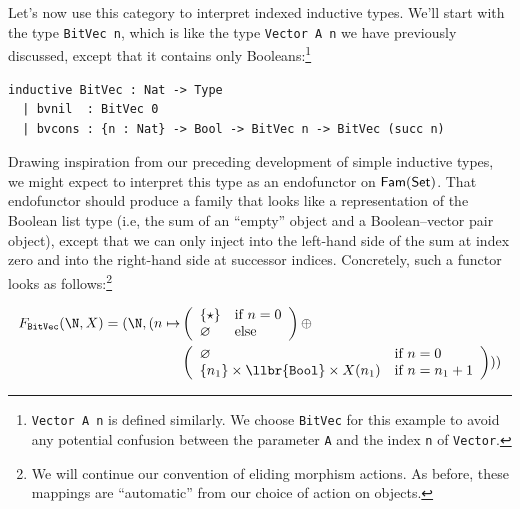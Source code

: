 
Let's now use this category to interpret indexed inductive types. We'll start with the type
\texttt{BitVec n}, which is like the type \texttt{Vector A n} we have previously discussed, except
that it contains only Booleans:\footnote{\texttt{Vector A n} is defined similarly. We choose
\texttt{BitVec} for this example to avoid any potential confusion between the parameter \texttt{A}
and the index \texttt{n} of \texttt{Vector}.}

\begin{lstlisting}
inductive BitVec : Nat -> Type
  | bvnil  : BitVec 0
  | bvcons : {n : Nat} -> Bool -> BitVec n -> BitVec (succ n)
\end{lstlisting}

Drawing inspiration from our preceding development of simple inductive types, we might expect to
interpret this type as an endofunctor on $\mathsf{Fam}(\mathsf{Set})$. That endofunctor should produce a family that
looks like a representation of the Boolean list type (i.e, the sum of an ``empty'' object and a
Boolean--vector pair object), except that we can only inject into the left-hand side of the sum at
index zero and into the right-hand side at successor indices. Concretely, such a functor looks as
follows:\footnote{We will continue our convention of eliding morphism actions. As before, these
mappings are ``automatic'' from our choice of action on objects.}

\begin{align*}
  F_\texttt{BitVec}(\N, X) = (\N, (n \mapsto
    &\left(\begin{array}{ll}\{\star\} & \text{if } n = 0 \\ \varnothing & \text{else} \end{array}\right)
    \oplus\\
    &\left(\begin{array}{ll} \varnothing & \text{if } n = 0 \\ \{n_1\} \times \llbr{\texttt{Bool}} \times X(n_1) & \text{if } n = n_1 + 1 \end{array} \right)
  ))
\end{align*}

